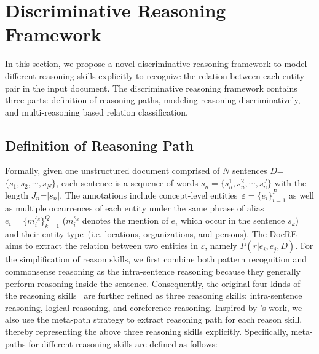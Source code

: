 \documentclass[11pt,a4paper]{article}
\begin{document}
\section{Discriminative Reasoning Framework}
\label{sec2}
In this section, we propose a novel discriminative reasoning framework to model different reasoning skills explicitly to recognize the relation between each entity pair in the input document.
The discriminative reasoning framework contains three parts: definition of reasoning paths, modeling reasoning discriminatively, and multi-reasoning based relation classification.


\subsection{Definition of Reasoning Path}
\label{sec2-1}
Formally, given one unstructured document comprised of $N$ sentences $D$=$\{s_1, s_2, \cdots, s_N\}$, each sentence is a sequence of words $s_n = \{s_{n}^{1}, s_{n}^{2}, \cdots, s_{n}^{J}\}$ with the length $J_n$=$|s_n|$.
The annotations include concept-level entities~$\varepsilon=\{e_i\}_{i=1}^P$ as well as multiple occurrences of each entity under the same phrase of alias $e_i=\{m_i^{s_k}\}_{k=1}^Q$ ($m_i^{s_k}$ denotes the mention of $e_i$ which occur in the sentence $s_k$) and their entity type~(i.e. locations, organizations, and persons).
The DocRE aims to extract the relation between two entities in $\varepsilon$, namely $P(r|e_i,e_j,D)$.
For the simplification of reason skills, we first combine both pattern recognition and commonsense reasoning as the intra-sentence reasoning because they generally perform reasoning inside the sentence.
Consequently, the original four kinds of the reasoning skills~\cite{yao-etal-2019-docred} are further refined as three reasoning skills: intra-sentence reasoning, logical reasoning, and coreference reasoning.
Inspired by \citeauthor{docred-rec}'s work, we also use the meta-path strategy to extract reasoning path for each reason skill, thereby representing the above three reasoning skills explicitly.
Specifically, meta-paths for different reasoning skills are defined as follows:
\end{document}
